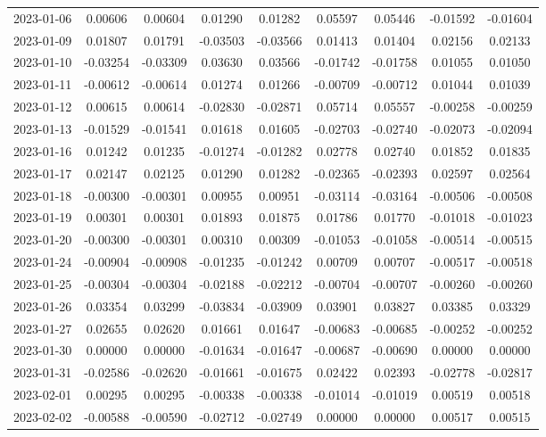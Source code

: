 {\begin{footnotesize}
\begin{longtable}{lcccccccc}
2023-01-06 & 0.00606 & 0.00604 & 0.01290 & 0.01282 & 0.05597 & 0.05446 & -0.01592 & -0.01604 \\
2023-01-09 & 0.01807 & 0.01791 & -0.03503 & -0.03566 & 0.01413 & 0.01404 & 0.02156 & 0.02133 \\
2023-01-10 & -0.03254 & -0.03309 & 0.03630 & 0.03566 & -0.01742 & -0.01758 & 0.01055 & 0.01050 \\
2023-01-11 & -0.00612 & -0.00614 & 0.01274 & 0.01266 & -0.00709 & -0.00712 & 0.01044 & 0.01039 \\
2023-01-12 & 0.00615 & 0.00614 & -0.02830 & -0.02871 & 0.05714 & 0.05557 & -0.00258 & -0.00259 \\
2023-01-13 & -0.01529 & -0.01541 & 0.01618 & 0.01605 & -0.02703 & -0.02740 & -0.02073 & -0.02094 \\
2023-01-16 & 0.01242 & 0.01235 & -0.01274 & -0.01282 & 0.02778 & 0.02740 & 0.01852 & 0.01835 \\
2023-01-17 & 0.02147 & 0.02125 & 0.01290 & 0.01282 & -0.02365 & -0.02393 & 0.02597 & 0.02564 \\
2023-01-18 & -0.00300 & -0.00301 & 0.00955 & 0.00951 & -0.03114 & -0.03164 & -0.00506 & -0.00508 \\
2023-01-19 & 0.00301 & 0.00301 & 0.01893 & 0.01875 & 0.01786 & 0.01770 & -0.01018 & -0.01023 \\
2023-01-20 & -0.00300 & -0.00301 & 0.00310 & 0.00309 & -0.01053 & -0.01058 & -0.00514 & -0.00515 \\
2023-01-24 & -0.00904 & -0.00908 & -0.01235 & -0.01242 & 0.00709 & 0.00707 & -0.00517 & -0.00518 \\
2023-01-25 & -0.00304 & -0.00304 & -0.02188 & -0.02212 & -0.00704 & -0.00707 & -0.00260 & -0.00260 \\
2023-01-26 & 0.03354 & 0.03299 & -0.03834 & -0.03909 & 0.03901 & 0.03827 & 0.03385 & 0.03329 \\
2023-01-27 & 0.02655 & 0.02620 & 0.01661 & 0.01647 & -0.00683 & -0.00685 & -0.00252 & -0.00252 \\
2023-01-30 & 0.00000 & 0.00000 & -0.01634 & -0.01647 & -0.00687 & -0.00690 & 0.00000 & 0.00000 \\
2023-01-31 & -0.02586 & -0.02620 & -0.01661 & -0.01675 & 0.02422 & 0.02393 & -0.02778 & -0.02817 \\
2023-02-01 & 0.00295 & 0.00295 & -0.00338 & -0.00338 & -0.01014 & -0.01019 & 0.00519 & 0.00518 \\
2023-02-02 & -0.00588 & -0.00590 & -0.02712 & -0.02749 & 0.00000 & 0.00000 & 0.00517 & 0.00515 \\

\end{longtable}
\end{footnotesize}}
